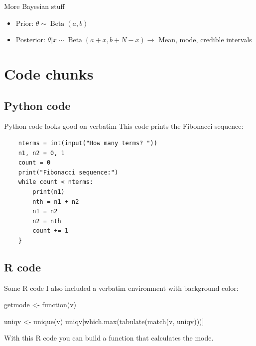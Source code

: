 \begin{frame}{More Bayesian stuff}
	\begin{itemize}
	\item Prior: $\theta \sim \operatorname{Beta}(a,b) $
	\item Posterior: $\theta | x \sim \operatorname{Beta}(a+x, b+N-x ) \rightarrow$ Mean, mode, credible intervals
	\end{itemize}
\end{frame}

\section{Code chunks}

\subsection{Python code}


\begin{frame}[fragile]{Python code looks good on verbatim}
	This code prints the Fibonacci sequence:
	\begin{verbatim}
	nterms = int(input("How many terms? "))
	n1, n2 = 0, 1
	count = 0
	print("Fibonacci sequence:")
	while count < nterms:
	    print(n1)
	    nth = n1 + n2
	    n1 = n2
	    n2 = nth
	    count += 1
	}
	\end{verbatim}
\end{frame}

\subsection{R code}


\begin{frame}[fragile]{Some R code}
I also included a verbatim environment with background color:
	\begin{cverbatim}
getmode <- function(v) {
  uniqv <- unique(v)
  uniqv[which.max(tabulate(match(v, uniqv)))]
  
}
	\end{cverbatim}
	With this R code you can build a function that calculates the mode.
\end{frame}



















